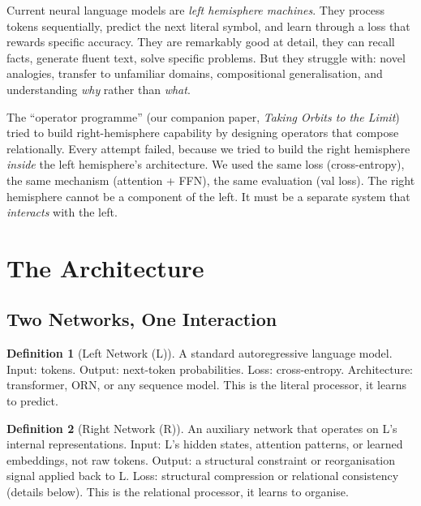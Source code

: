 \documentclass[11pt, a4paper]{article}
\theoremstyle{plain}
\theoremstyle{definition}
\newtheorem{definition}{Definition}
\theoremstyle{remark}
\begin{document}
Current neural language models are \emph{left hemisphere machines}.
They process tokens sequentially, predict the next literal symbol, and learn through a loss that rewards specific accuracy.
They are remarkably good at detail, they can recall facts, generate fluent text, solve specific problems.
But they struggle with: novel analogies, transfer to unfamiliar domains, compositional generalisation, and understanding \emph{why} rather than \emph{what}.

The ``operator programme'' (our companion paper, \emph{Taking Orbits to the Limit}) tried to build right-hemisphere capability by designing operators that compose relationally.
Every attempt failed, because we tried to build the right hemisphere \emph{inside} the left hemisphere's architecture.
We used the same loss (cross-entropy), the same mechanism (attention + FFN), the same evaluation (val loss).
The right hemisphere cannot be a component of the left.
It must be a separate system that \emph{interacts} with the left.


\section{The Architecture}

\subsection{Two Networks, One Interaction}

\begin{definition}[Left Network (L)]
A standard autoregressive language model.
Input: tokens.
Output: next-token probabilities.
Loss: cross-entropy.
Architecture: transformer, ORN, or any sequence model.
This is the literal processor, it learns to predict.
\end{definition}

\begin{definition}[Right Network (R)]
An auxiliary network that operates on L's internal representations.
Input: L's hidden states, attention patterns, or learned embeddings, not raw tokens.
Output: a structural constraint or reorganisation signal applied back to L.
Loss: structural compression or relational consistency (details below).
This is the relational processor, it learns to organise.
\end{definition}
\end{document}
